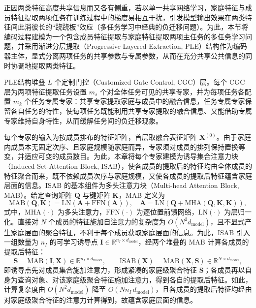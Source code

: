 正因两类特征高度共享信息而又各有侧重，若以单一共享网络学习，家庭特征与成员特征提取两项任务在训练过程中的梯度易相互干扰，引发模型输出效果在两类特征间此消彼长的``跷跷板''效应（多任务学习中经典的负迁移问题）。为此，本节将编码过程建模为一个包含成员特征提取与家庭特征提取两项主任务的多任务学习问题，并采用渐进分层提取（Progressive Layered Extraction, PLE）\citep{tangProgressiveLayeredExtraction2020}结构作为编码器主体，显式分离两项任务的共享参数与专属参数，从而在充分共享公共信息的同时协调地提取两类特征。

PLE结构堆叠 $L$ 个定制门控（Customized Gate Control, CGC）层。每个 CGC 层为两项特征提取任务设置 $m_s$ 个对全体任务可见的共享专家，并为每项任务各配置 $m_k$ 个任务专属专家：共享专家提取家庭与成员中的融合信息，任务专属专家保留各自任务的特性，使每项任务既能利用共享专家提取的融合信息、又能借助专属专家维持自身特性，从而缓解任务间的负迁移现象。

每个专家的输入为按成员排布的特征矩阵，首层取融合表征矩阵 $\mathbf{X}^{(0)}$。由于家庭内成员本无固定次序、且家庭规模随家庭而异，专家须对成员的排列保持置换等变，并适应可变的成员数目。为此，本章将每个专家建模为诱导集合注意力块（Induced Set-Attention Block, ISAB）\citep{leeSetTransformerFramework2019}，使各成员的提取后的特征均由全体成员的特征聚合而来，既不依赖成员次序与家庭规模，又使各成员的提取后特征蕴含家庭层面的信息。ISAB 的基本组件为多头注意力块（Multi-head Attention Block, MAB）。给定查询矩阵 $\mathbf{Q}$ 与键矩阵 $\mathbf{K}$，MAB 定义为
\begin{equation}
\mathrm{MAB}(\mathbf{Q},\mathbf{K})=\mathrm{LN}\!\left(\mathbf{A}+\mathrm{FFN}(\mathbf{A})\right),\quad \mathbf{A}=\mathrm{LN}\!\left(\mathbf{Q}+\mathrm{MHA}(\mathbf{Q},\mathbf{K},\mathbf{K})\right),
\label{eq.cohact.mab}
\end{equation}
式中，$\mathrm{MHA}(\cdot)$ 为多头注意力，$\mathrm{FFN}(\cdot)$ 为逐位置前馈网络，$\mathrm{LN}(\cdot)$ 为层归一化。直接对 $N$ 个成员的特征施加自注意力的复杂度为 $O(N^{2}d_{\text{model}})$，且不显式产生家庭层面的聚合特征，不利于每个成员获取家庭层面的信息。为此，ISAB 引入一组数量为 $n_I$ 的可学习诱导点 $\mathbf{I}\in\mathbb{R}^{n_I\times d_{\text{model}}}$，经两个堆叠的 MAB 计算各成员的提取后特征：
\begin{equation}
\mathbf{S}=\mathrm{MAB}(\mathbf{I},\mathbf{X})\in\mathbb{R}^{n_I\times d_{\text{model}}},\qquad \mathrm{ISAB}(\mathbf{X})=\mathrm{MAB}(\mathbf{X},\mathbf{S})\in\mathbb{R}^{N\times d_{\text{model}}},
\label{eq.cohact.isab}
\end{equation}
即诱导点先对成员集合施加注意力，形成紧凑的家庭级聚合特征 $\mathbf{S}$；各成员再以自身为查询对象、对该家庭级聚合特征施加注意力，得到各自的提取后特征。如此，计算复杂度由 $O(N^{2}d_{\text{model}})$ 降至 $O(N n_I\,d_{\text{model}})$，且各成员的提取后特征均经由对家庭级聚合特征的注意力计算得到，故蕴含家庭层面的信息。


